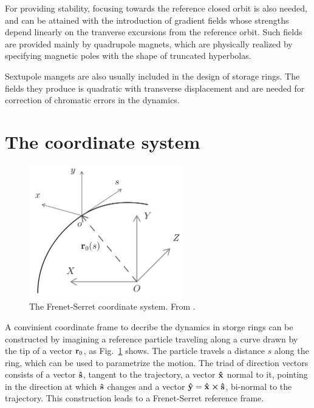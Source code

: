 For providing stability, focusing towards the reference closed orbit is also needed, and can be attained with the introduction of gradient fields whose strengths depend linearly on the tranverse excursions from the reference orbit. Such fields are provided mainly by quadrupole magnets, which are physically realized by specifying  magnetic poles with the shape of truncated hyperbolas.

Sextupole mangets are also usually included in the design of storage rings. The fields they produce is quadratic with transverse displacement and are needed for correction of chromatic errors in the dynamics.

\section{The coordinate system}
\begin{figure}[htb]
    \centering
    \includegraphics[width=0.6\textwidth]{Images/frenetserret.png}
    \caption{The Frenet-Serret coordinate system. From \cite{huang2019beam}.}
    \label{fig:frenet-serret}
\end{figure}
A convinient coordinate frame to decribe the dynamics in storge rings can be constructed by imagining a reference particle traveling along a curve drawn by the tip of a vector $\vb{r}_0$, as Fig.~\ref{fig:frenet-serret} shows. The particle travels a distance $s$ along the ring, which can be used to parametrize the motion. The triad of direction vectors consists of a vector $\vu{s}$, tangent to the trajectory, a vector $\vu{x}$ normal to it, pointing in the direction at which $\vu{s}$ changes and a vector $\vu{y}=\vu{x}\cross\vu{s}$, bi-normal to the trajectory. This construction leads to a Frenet-Serret reference frame.

